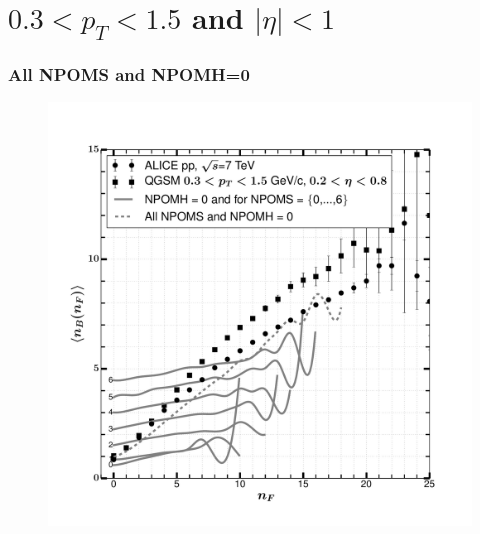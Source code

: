 \documentclass[]{article}
\begin{document}
\listoffigures
\listoftables

\newpage
\section*{\centering $ 0.3 < p_T < 1.5$ and $ |\eta|<1$}
\subsubsection*{\centering All NPOMS and NPOMH=0}

\begin{figure}[h!]
    \centering
\includegraphics[scale=0.5]{../analyzed/nbnf_allnpoms_0npomh.pdf}
    \caption[All NPOMS and NPOMH=0]{}
\end{figure}
\end{document}

